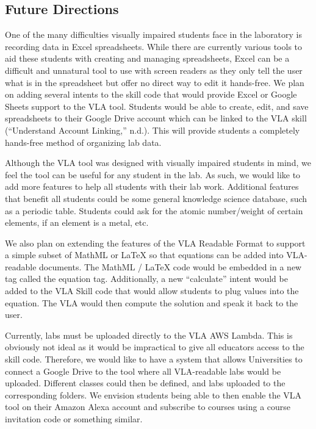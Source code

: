 \documentclass[11.5pt]{sig-alternate} %
\begin{document}
\begin{large}
\subsection*{Future Directions}

One of the many difficulties visually impaired students face in the laboratory is recording data in Excel spreadsheets. While there are currently various tools to aid these students with creating and managing spreadsheets, Excel can be a difficult and unnatural tool to use with screen readers as they only tell the user what is in the spreadsheet but offer no direct way to edit it hands-free. We plan on adding several intents to the skill code that would provide Excel or Google Sheets support to the VLA tool. Students would be able to create, edit, and save spreadsheets to their Google Drive account which can be linked to the VLA skill (“Understand Account Linking,” n.d.). This will provide students a completely hands-free method of organizing lab data.

Although the VLA tool was designed with visually impaired students in mind, we feel the tool can be useful for any student in the lab. As such, we would like to add more features to help all students with their lab work. Additional features that benefit all students could be some general knowledge science database, such as a periodic table. Students could ask for the atomic number/weight of certain elements, if an element is a metal, etc.

We also plan on extending the features of the VLA Readable Format to support a simple subset of MathML or LaTeX so that equations can be added into VLA-readable documents. The MathML / LaTeX code would be embedded in a new tag called the equation tag. Additionally, a new “calculate” intent would be added to the VLA Skill code that would allow students to plug values into the equation. The VLA would then compute the solution and speak it back to the user.

Currently, labs must be uploaded directly to the VLA AWS Lambda. This is obviously not ideal as it would be impractical to give all educators access to the skill code. Therefore, we would like to have a system that allows Universities to connect a Google Drive to the tool where all VLA-readable labs would be uploaded. Different classes could then be defined, and labs uploaded to the corresponding folders. We envision students being able to then enable the VLA tool on their Amazon Alexa account and subscribe to courses using a course invitation code or something similar. 


\end{large}
\end{document}

